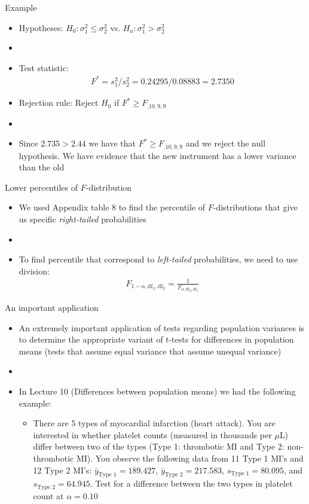 \documentclass[xcolor=dvipsnames]{beamer}
\begin{document}
\begin{frame}{Example}
	\begin{itemize}
		\item Hypotheses: $H_0: \sigma_1^2 \leq \sigma_2^2$ vs. $H_a: \sigma_1^2 > \sigma_2^2$
		\item[]
		\item Test statistic:
		\begin{gather*}
		F^* = s_1^2 /s_2^2 = 0.24295 /  0.08883 = 2.7350
		\end{gather*}
		\item Rejection rule: Reject $H_0$ if $F^* \geq F_{.10, 9, 9}$ \pause
		\item[]
		\item Since $2.735 > 2.44$ we have that $F^* \geq F_{.10, 9, 9}$ and we reject the null hypothesis. We have evidence that the new instrument has a lower variance than the old
	\end{itemize}
\end{frame}

\begin{frame}{Lower percentiles of $F$-distribution}
	\begin{itemize}
		\item We used Appendix table 8 to find the percentile of $F$-distributions that give us specific \emph{right-tailed} probabilities \pause
		\item[]
		\item To find percentile that correspond to \emph{left-tailed} probabilities, we need to use division: \pause
		\begin{gather*}
			F_{1-\alpha, \text{df}_1, \text{df}_2} = \frac{1}{F_{\alpha, \text{df}_2, \text{df}_1}}
		\end{gather*} 
	\end{itemize}
\end{frame}

\begin{frame}{An important application}
	\begin{itemize}
		\item An extremely important application of tests regarding population variances is to determine the appropriate variant of $t$-tests for differences in population means (tests that assume equal variance that assume unequal variance) \pause
		\item[]
		\item In Lecture 10 (Differences between population means) we had the following example: \pause
		\begin{itemize}
			\item There are 5 types of myocardial infarction (heart attack). You are interested in whether platelet counts (measured in thousands per $\mu$L) differ between two of the types (Type 1: thrombotic MI and Type 2: non-thrombotic MI). You observe the following data from 11 Type 1 MI's and 12 Type 2 MI's: $\bar{y}_{\text{Type 1}}=189.427$, $\bar{y}_{\text{Type 2}}=217.583$, $s_{\text{Type 1}} = 80.095$, and $s_{\text{Type 2}} = 64.945$. Test for a difference between the two types in platelet count at $\alpha = 0.10$
		\end{itemize}
	\end{itemize}
\end{frame}
\end{document}

